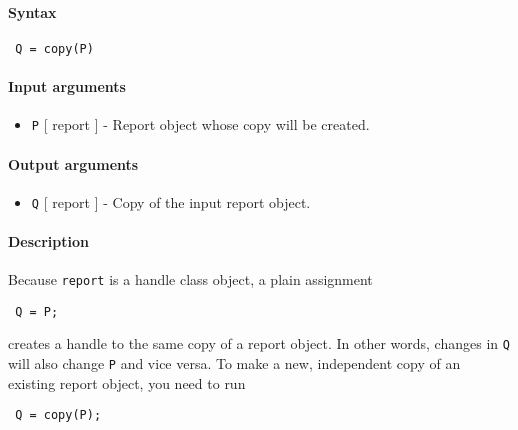 


	\paragraph{Syntax}
 
 \begin{verbatim}
 Q = copy(P)
 \end{verbatim}
 
 \paragraph{Input arguments}
 
 \begin{itemize}
 \item
   \texttt{P} {[} report {]} - Report object whose copy will be created.
 \end{itemize}
 
 \paragraph{Output arguments}
 
 \begin{itemize}
 \item
   \texttt{Q} {[} report {]} - Copy of the input report object.
 \end{itemize}
 
 \paragraph{Description}
 
 Because \texttt{report} is a handle class object, a plain assignment
 
 \begin{verbatim}
 Q = P;
 \end{verbatim}
 
 creates a handle to the same copy of a report object. In other words,
 changes in \texttt{Q} will also change \texttt{P} and vice versa. To
 make a new, independent copy of an existing report object, you need to
 run
 
 \begin{verbatim}
 Q = copy(P);
 \end{verbatim}


